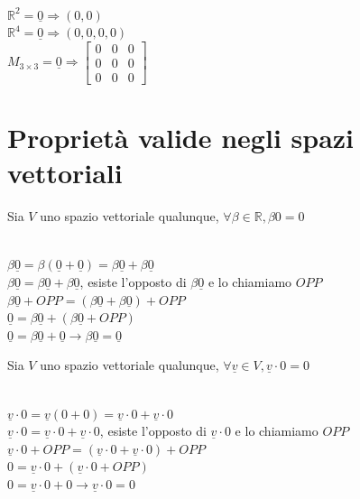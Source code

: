 \begin{es}
	\phantom{}\\
	$\mathbb{R}^2=\underline{0} \Rightarrow (0,0)$\\
	$\mathbb{R}^4=\underline{0} \Rightarrow (0,0,0,0)$\\
	$M_{3\times3}=\underline{0} \Rightarrow 
	\begin{bmatrix}
    0 & 0 & 0 \\
	0 & 0 & 0 \\
	0 & 0 & 0
	\end{bmatrix}$
\end{es}

\section{Proprietà valide negli spazi vettoriali}

\begin{proposizione}
	Sia $V$ uno spazio vettoriale qualunque, $\forall\beta\in\mathbb{R}, \beta 0=0$\\
    \begin{dimostrazione}
    	\phantom{}\\
    	$\beta \underline{0}=\beta(\underline{0}+\underline{0})=\beta \underline{0}+\beta \underline{0}$\\
    	$\beta \underline{0}=\beta \underline{0}+\beta \underline{0}$, esiste l'opposto di $\beta \underline{0}$ e lo chiamiamo $OPP$\\
    	$\beta \underline{0}+ OPP=(\beta \underline{0}+\beta \underline{0})+OPP$\\
    	$\underline{0}=\beta \underline{0}+(\beta \underline{0}+OPP)$\\
    	$\underline{0}=\beta \underline{0}+\underline{0}\rightarrow \beta \underline{0}=\underline{0}$
    \end{dimostrazione}
\end{proposizione}

\begin{proposizione}
	Sia $V$ uno spazio vettoriale qualunque, $\forall \underline{v}\in V, \underline{v}\cdot0=0$\\
	\begin{dimostrazione}
		\phantom{}\\
		$\underline{v}\cdot0=\underline{v}(0+0)=\underline{v}\cdot0+\underline{v}\cdot0$\\
		$\underline{v}\cdot0=\underline{v}\cdot0+\underline{v}\cdot0$, esiste l'opposto di $\underline{v}\cdot0$ e lo chiamiamo $OPP$\\
		$\underline{v}\cdot0+ OPP=(\underline{v}\cdot0+\underline{v}\cdot0)+OPP$\\
		$0=\underline{v}\cdot0+(\underline{v}\cdot0+OPP)$\\
		$0=\underline{v}\cdot0+0\rightarrow \underline{v}\cdot0=0$
	\end{dimostrazione}
\end{proposizione}

